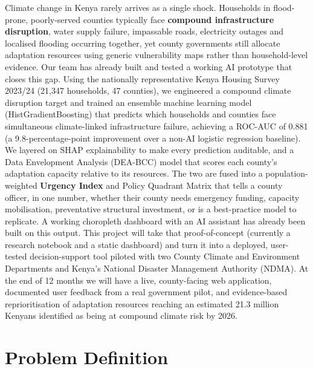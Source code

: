 \documentclass[12pt,a4paper]{article}
\begin{document}
Climate change in Kenya rarely arrives as a single shock. Households in flood-prone, poorly-served counties typically face \textbf{compound infrastructure disruption}, water supply failure, impassable roads, electricity outages and localised flooding occurring together, yet county governments still allocate adaptation resources using generic vulnerability maps rather than household-level evidence. Our team has already built and tested a working AI prototype that closes this gap. Using the nationally representative Kenya Housing Survey 2023/24 (21,347 households, 47 counties), we engineered a compound climate disruption target and trained an ensemble machine learning model (HistGradientBoosting) that predicts which households and counties face simultaneous climate-linked infrastructure failure, achieving a ROC-AUC of 0.881 (a 9.8-percentage-point improvement over a non-AI logistic regression baseline). We layered on SHAP explainability to make every prediction auditable, and a Data Envelopment Analysis (DEA-BCC) model that scores each county's adaptation capacity relative to its resources. The two are fused into a population-weighted \textbf{Urgency Index} and Policy Quadrant Matrix that tells a county officer, in one number, whether their county needs emergency funding, capacity mobilisation, preventative structural investment, or is a best-practice model to replicate. A working choropleth dashboard with an AI assistant has already been built on this output. This project will take that proof-of-concept (currently a research notebook and a static dashboard) and turn it into a deployed, user-tested decision-support tool piloted with two County Climate and Environment Departments and Kenya's National Disaster Management Authority (NDMA). At the end of 12 months we will have a live, county-facing web application, documented user feedback from a real government pilot, and evidence-based reprioritisation of adaptation resources reaching an estimated 21.3 million Kenyans identified as being at compound climate risk by 2026.

\newpage
\section{Problem Definition}
\end{document}
